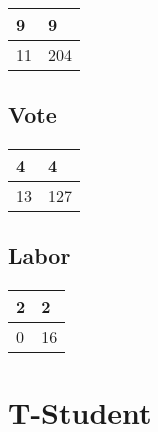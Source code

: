 \documentclass[10pt, a4paper,spanish]{article}
\begin{document}
			\paragraph{}

			\center
			\begin{tabular}{ | l | l | }
				\hline
				9 & 9 \\ \hline
				11 & 204 \\
				\hline
			\end{tabular}


		\subsection{Vote}

			\paragraph{}

			\begin{tabular}{ | l | l | }
				\hline
				4 & 4 \\ \hline
				13 & 127 \\
				\hline
			\end{tabular}

		\subsection{Labor}

			\paragraph{}

			\begin{tabular}{ | l | l | }
				\hline
				2 & 2 \\ \hline
				0 & 16 \\
				\hline
			\end{tabular}

	\section{T-Student}

        \paragraph{}
\end{document}
